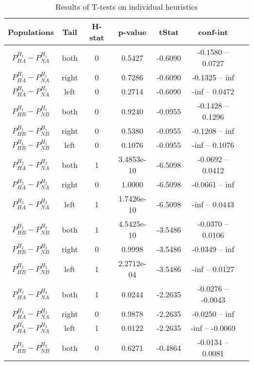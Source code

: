\documentclass[../main.tex]{subfiles}
\begin{document}
\begin{table}
    \centering
    \caption{Results of T-tests on individual heuristics}
        \begin{tabular}{ccccccc}
        \hline
            Populations                 & Tail   &H-stat   & p-value    & tStat & conf-int \\ 
        \hline                
            $P^{H_1}_{HA}-P^{H_1}_{NA}$    & both  & 0 & 0.5427    & -0.6090  & -0.1580 -- 0.0727 \\
            $P^{H_1}_{HA}-P^{H_1}_{NA}$    & right & 0 & 0.7286    & -0.6090  & -0.1325 -- inf    \\
            $P^{H_1}_{HA}-P^{H_1}_{NA}$    & left  & 0 & 0.2714    & -0.6090  & -inf -- 0.0472    \\
            $P^{H_1}_{HB}-P^{H_1}_{NB}$    & both  & 0 & 0.9240    & -0.0955  & -0.1428 -- 0.1296 \\
            $P^{H_1}_{HB}-P^{H_1}_{NB}$    & right & 0 & 0.5380    & -0.0955  & -0.1208 -- inf    \\
            $P^{H_1}_{HB}-P^{H_1}_{NB}$    & left  & 0 & 0.1076    & -0.0955  & -inf -- 0.1076    \\
            $P^{H_2}_{HA}-P^{H_2}_{NA}$    & both  & 1 & 3.4853e-10& -6.5098  & -0.0692 -- 0.0412 \\
            $P^{H_2}_{HA}-P^{H_2}_{NA}$    & right & 0 & 1.0000    & -6.5098  & -0.0661 -- inf    \\
            $P^{H_2}_{HA}-P^{H_2}_{NA}$    & left  & 1 & 1.7426e-10& -6.5098  & -inf -- 0.0443    \\
            $P^{H_2}_{HB}-P^{H_2}_{NB}$    & both  & 1 & 4.5425e-10& -3.5486  & -0.0370 -- 0.0106 \\
            $P^{H_2}_{HB}-P^{H_2}_{NB}$    & right & 0 & 0.9998    & -3.5486  & -0.0349 -- inf    \\
            $P^{H_2}_{HB}-P^{H_2}_{NB}$    & left  & 1 & 2.2712e-04& -3.5486  & -inf -- 0.0127    \\
            $P^{H_3}_{HA}-P^{H_3}_{NA}$    & both  & 1 & 0.0244    & -2.2635  & -0.0276 -- -0.0043\\
            $P^{H_3}_{HA}-P^{H_3}_{NA}$    & right & 0 & 0.9878    & -2.2635  & -0.0250 -- inf    \\
            $P^{H_3}_{HA}-P^{H_3}_{NA}$    & left  & 1 & 0.0122    & -2.2635  & -inf -- -0.0069  \\
            $P^{H_3}_{HB}-P^{H_3}_{NB}$    & both  & 0 & 0.6271    & -0.4864  & -0.0134 -- 0.0081  \\

\end{tabular}
\end{table}
\end{document}
